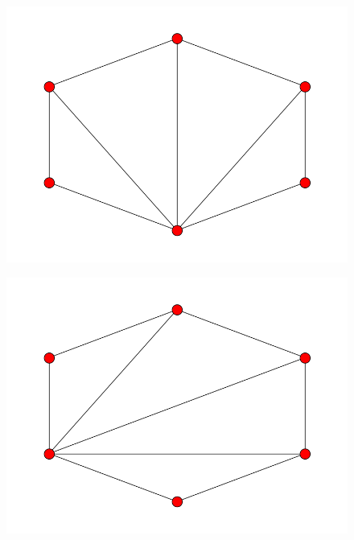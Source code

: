\documentclass[fontsize=10pt]{article}
\begin{document}
\begin{figure}[hbtp]
\centering
\includegraphics[scale=0.5]{imgs/hexagon/hexagon_4.png}
\end{figure}

\begin{figure}[hbtp]
\centering
\includegraphics[scale=0.5]{imgs/hexagon/hexagon_5.png}
\end{figure}
\end{document}
